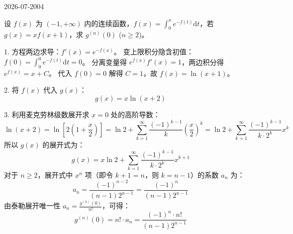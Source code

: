 \begin{mistake}{2026-07-20}{04}

\begin{problemcontent}
设 \(f(x)\) 为 \((-1, +\infty)\) 内的连续函数，\(f(x) = \int_0^x e^{-f(t)} \mathrm{d}t\)，若 \(g(x) = xf(x+1)\)，求 \(g^{(n)}(0)\) (\(n \ge 2\))。
\end{problemcontent}

\begin{solutioncontent}
1. 方程两边求导：\(f'(x) = e^{-f(x)}\)。
变上限积分隐含初值：\(f(0) = \int_0^0 e^{-f(t)} \mathrm{d}t = 0\)。
分离变量得 \(e^{f(x)} f'(x) = 1\)，两边积分得 \(e^{f(x)} = x + C\)。
代入 \(f(0)=0\) 解得 \(C=1\)，故 \(f(x) = \ln(x+1)\)。

2. 将 \(f(x)\) 代入 \(g(x)\)：
\[
g(x) = x \ln(x+2)
\]

3. 利用麦克劳林级数展开求 \(x=0\) 处的高阶导数：
\[
\ln(x+2) = \ln\left[2\left(1+\frac{x}{2}\right)\right] = \ln 2 + \sum_{k=1}^\infty \frac{(-1)^{k-1}}{k}\left(\frac{x}{2}\right)^k = \ln 2 + \sum_{k=1}^\infty \frac{(-1)^{k-1}}{k \cdot 2^k} x^k
\]
所以 \(g(x)\) 的展开式为：
\[
g(x) = x \ln 2 + \sum_{k=1}^\infty \frac{(-1)^{k-1}}{k \cdot 2^k} x^{k+1}
\]
对于 \(n \ge 2\)，展开式中 \(x^n\) 项（即令 \(k+1=n\)，则 \(k=n-1\)）的系数 \(a_n\) 为：
\[
a_n = \frac{(-1)^{n-2}}{(n-1)2^{n-1}} = \frac{(-1)^n}{(n-1)2^{n-1}}
\]
由泰勒展开唯一性 \(a_n = \frac{g^{(n)}(0)}{n!}\)，可得：
\[
g^{(n)}(0) = n! \cdot a_n = \frac{(-1)^n \cdot n!}{(n-1)2^{n-1}}
\]
\end{solutioncontent}


\end{mistake}
